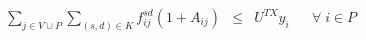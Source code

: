 \begin{figure}
		
		\begin{equation} \label{eq:capTX}
		\begin{array}{rrclcl}
		& \displaystyle \sum_{j \in V \cup P} \displaystyle \sum_{(s,d) \in K} f^{sd}_{ij} (1 + A_{ij}) & \leq & U^{TX} y_{i} && \forall \; i \in P \\
		\end{array}
		\end{equation}
		
		

\end{figure}
